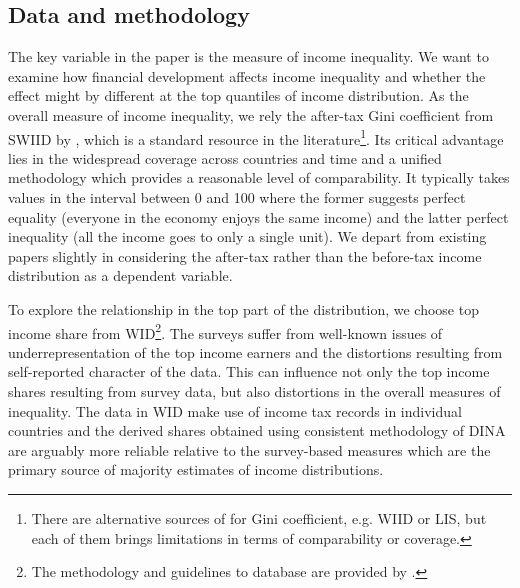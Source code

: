 \begin{refsection}

%
%
%
%
%

\section{Data and methodology}
The key variable in the paper is the measure of income inequality. We want to examine how financial development affects income inequality and whether the effect might by different at the top quantiles of income distribution. As the overall measure of income inequality, we rely the after-tax Gini coefficient from \ac{SWIID} by \textcite{Solt2019}, which is a standard resource in the literature\footnote{There are alternative sources of for Gini coefficient, e.g. \ac{WIID} or \ac{LIS}, but each of them brings limitations in terms of comparability or coverage.}. Its critical advantage lies in the widespread coverage across countries and time and a unified methodology which provides a reasonable level of comparability. It typically takes values in the interval between 0 and 100 where the former suggests perfect equality (everyone in the economy enjoys the same income) and the latter perfect inequality (all the income goes to only a single unit). We depart from existing papers slightly in considering the after-tax rather than the before-tax income distribution as a dependent variable. 

To explore the relationship in the top part of the distribution, we choose top income share from \ac{WID}\footnote{The methodology and guidelines to database are provided by \textcite{alvaredo2016distributional}.}. The surveys suffer from well-known issues of underrepresentation of the top income earners and the distortions resulting from self-reported character of the data. This can influence not only the top income shares resulting from survey data, but also distortions in the overall measures of inequality. The data in \ac{WID} make use of income tax records in individual countries and the derived shares obtained using consistent methodology of \ac{DINA} are arguably more reliable relative to the survey-based measures which are the primary source of majority estimates of income distributions. 


\end{refsection}
